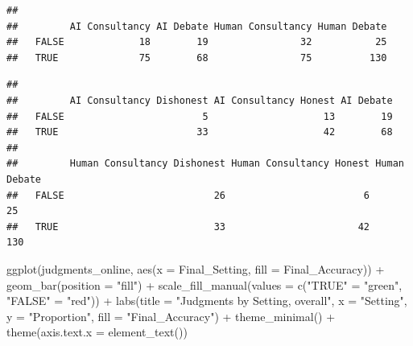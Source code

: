 \documentclass[
]{article}
\newenvironment{Shaded}{\begin{snugshade}}{\end{snugshade}}
\newcommand{\AttributeTok}[1]{\textcolor[rgb]{0.77,0.63,0.00}{#1}}
\newcommand{\FunctionTok}[1]{\textcolor[rgb]{0.00,0.00,0.00}{#1}}
\newcommand{\NormalTok}[1]{#1}
\newcommand{\OtherTok}[1]{\textcolor[rgb]{0.56,0.35,0.01}{#1}}
\newcommand{\SpecialCharTok}[1]{\textcolor[rgb]{0.00,0.00,0.00}{#1}}
\newcommand{\StringTok}[1]{\textcolor[rgb]{0.31,0.60,0.02}{#1}}
\begin{document}
\begin{verbatim}
##        
##         AI Consultancy AI Debate Human Consultancy Human Debate
##   FALSE             18        19                32           25
##   TRUE              75        68                75          130
\end{verbatim}

\begin{Shaded}
\end{Shaded}

\begin{verbatim}
##        
##         AI Consultancy Dishonest AI Consultancy Honest AI Debate
##   FALSE                        5                    13        19
##   TRUE                        33                    42        68
##        
##         Human Consultancy Dishonest Human Consultancy Honest Human Debate
##   FALSE                          26                        6           25
##   TRUE                           33                       42          130
\end{verbatim}

\begin{Shaded}
\begin{Highlighting}[]
\FunctionTok{ggplot}\NormalTok{(judgments\_online, }\FunctionTok{aes}\NormalTok{(}\AttributeTok{x =}\NormalTok{ Final\_Setting, }\AttributeTok{fill =}\NormalTok{ Final\_Accuracy)) }\SpecialCharTok{+}
  \FunctionTok{geom\_bar}\NormalTok{(}\AttributeTok{position =} \StringTok{"fill"}\NormalTok{) }\SpecialCharTok{+}
  \FunctionTok{scale\_fill\_manual}\NormalTok{(}\AttributeTok{values =} \FunctionTok{c}\NormalTok{(}\StringTok{"TRUE"} \OtherTok{=} \StringTok{"green"}\NormalTok{, }\StringTok{"FALSE"} \OtherTok{=} \StringTok{"red"}\NormalTok{)) }\SpecialCharTok{+}
  \FunctionTok{labs}\NormalTok{(}\AttributeTok{title =} \StringTok{"Judgments by Setting, overall"}\NormalTok{, }\AttributeTok{x =} \StringTok{"Setting"}\NormalTok{, }\AttributeTok{y =} \StringTok{"Proportion"}\NormalTok{, }\AttributeTok{fill =} \StringTok{"Final\_Accuracy"}\NormalTok{) }\SpecialCharTok{+}
  \FunctionTok{theme\_minimal}\NormalTok{() }\SpecialCharTok{+}
  \FunctionTok{theme}\NormalTok{(}\AttributeTok{axis.text.x =} \FunctionTok{element\_text}\NormalTok{())}
\end{Highlighting}
\end{Shaded}
\end{document}
